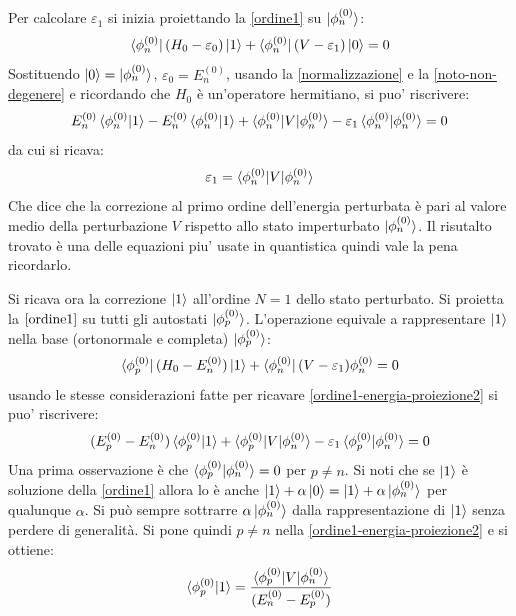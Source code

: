 \documentclass[a4paper, 10pt]{article}
\newcommand{\reff}[1]{\mbox{\ref{#1}}}
\begin{document}
Per calcolare $\varepsilon_1$ si inizia proiettando la \reff{ordine1} su $\ket{\phi_n^{(0)}}$:
\begin{equation}
	\label{ordine1-energia-proiezione}
	\bra{\phi_n^{(0)}}(H_0 - \varepsilon_0) \ket{1} + \bra{\phi_n^{(0)}}(V - \varepsilon_1)\ket{0} = 0
\end{equation}
Sostituendo $\ket{0} = \ket{\phi_{n}^{(0)}}$, $\varepsilon_0 = E_n^{(0)}$, usando la \reff{normalizzazione} e la \reff{noto-non-degenere} e ricordando che $H_0$ è un'operatore hermitiano, si puo' riscrivere:
\begin{equation}
	\label{ordine1-energia-proiezione2}
	E_n^{(0)}\braket{\phi_n^{(0)} | 1} - E_n^{(0)}\braket{\phi_n^{(0)} | 1} + \braket{\phi_n^{(0)}|V|\phi_n^{(0)}} - \varepsilon_1 \braket{\phi_n^{(0)}|\phi_n^{(0)}} = 0
\end{equation}
da cui si ricava:
\begin{equation}
	\label{energia1}
	\varepsilon_1 = \braket{\phi_n^{(0)}|V|\phi_n^{(0)}}
\end{equation}
Che dice che la correzione al primo ordine dell'energia perturbata è pari al valore medio della perturbazione $V$ rispetto allo stato imperturbato $\ket{\phi_n^{(0)}}$. Il risutalto trovato è una delle equazioni piu' usate in quantistica quindi vale la pena ricordarlo.

Si ricava ora la correzione $\ket{1}$ all'ordine $N = 1$ dello stato perturbato. Si proietta la $\reff{ordine1}$ su tutti gli autostati $\ket{\phi_{p}^{(0)}}$. L'operazione equivale a rappresentare $\ket{1}$ nella base (ortonormale e completa) $\ket{\phi_{p}^{(0)}}$:
\begin{equation}
	\label{ordine1-vettore-proiezione}
	\bra{\phi_p^{(0)}}(H_0 - E_n^{(0)}) \ket{1} + \bra{\phi_n^{(0)}}(V - \varepsilon_1)\phi_n^{(0)} = 0
\end{equation}
usando le stesse considerazioni fatte per ricavare \reff{ordine1-energia-proiezione2} si puo' riscrivere:
\begin{equation}
	\label{ordine1-vettore-proiezione2}
	(E_p^{(0)} - E_n^{(0)}) \braket{\phi_p^{(0)} | 1} + \braket{\phi_p^{(0)} | V | \phi_n^{(0)}} - \varepsilon_1 \braket{\phi_p^{(0)} | \phi_n^{(0)}} = 0
\end{equation}
Una prima osservazione è che $ \braket{\phi_p^{(0)} | \phi_n^{(0)}} = 0$ per $p \ne n$. Si noti che se $\ket{1}$ è soluzione della \reff{ordine1} allora lo è anche $\ket{1} + \alpha \ket{0} = \ket{1} + \alpha \ket{\phi_{n}^{(0)}}$ per qualunque $\alpha$. Si può sempre sottrarre $\alpha\ket{\phi_{n}^{(0)}}$ dalla rappresentazione di $\ket{1}$ senza perdere di generalità. Si pone quindi $p \ne n$ nella \reff{ordine1-energia-proiezione2} e si ottiene:
\begin{equation}
	\label{ordine1-vettore-proiezione3}
	\braket{\phi_p^{(0)} | 1} = \frac{\braket{\phi_p^{(0)} | V | \phi_n^{(0)}}}{(E_n^{(0)} - E_p^{(0)}) }
\end{equation}
\end{document}
